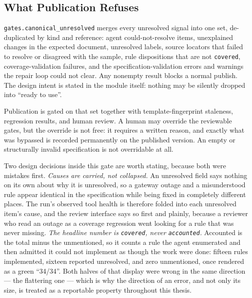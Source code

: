 \subsection{What Publication Refuses}

\texttt{gates.canonical\_unresolved} merges every unresolved signal into one set, de-duplicated by kind
and reference: agent could-not-resolve items, unexplained changes in the expected document, unresolved
labels, source locators that failed to resolve or disagreed with the sample, rule dispositions that are
not \texttt{covered}, coverage-validation failures, and the specification-validation errors and warnings
the repair loop could not clear. Any nonempty result blocks a normal publish. The design intent is
stated in the module itself: nothing may be silently dropped into ``ready to use''.

Publication is gated on that set together with template-fingerprint staleness, regression results, and
human review. A human may override the reviewable gates, but the override is not free: it requires a
written reason, and exactly what was bypassed is recorded permanently on the published version. An
empty or structurally invalid specification is not overridable at all.

Two design decisions inside this gate are worth stating, because both were mistakes first.
\emph{Causes are carried, not collapsed.} An unresolved field says nothing on its own about why it is
unresolved, so a gateway outage and a misunderstood rule appear identical in the specification while
being fixed in completely different places. The run's observed tool health is therefore folded into each
unresolved item's cause, and the review interface says so first and plainly, because a reviewer who read
an outage as a coverage regression went looking for a rule that was never missing. \emph{The headline
number is \texttt{covered}, never \texttt{accounted}.} Accounted is the total minus the unmentioned, so
it counts a rule the agent enumerated and then admitted it could not implement as though the work were
done: fifteen rules implemented, sixteen reported unresolved, and zero unmentioned, once rendered as a
green ``34/34''. Both halves of that display were wrong in the same direction --- the flattering one ---
which is why the direction of an error, and not only its size, is treated as a reportable property
throughout this thesis.


